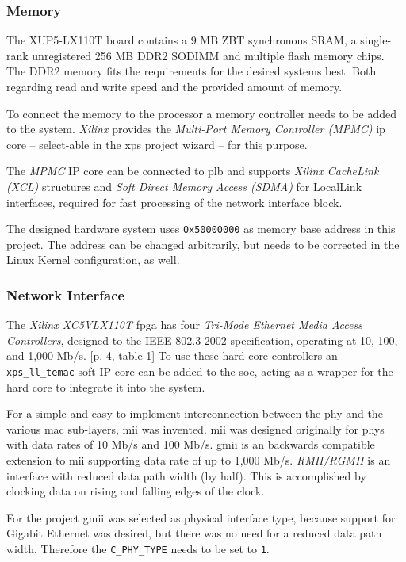\subsubsection{Memory}

The XUP5-LX110T board contains a 9 MB ZBT synchronous SRAM, a single-rank unregistered 256 MB DDR2 SODIMM and multiple flash memory chips. The DDR2 memory fits the requirements for the desired systems best. Both regarding read and write speed and the provided amount of memory.

To connect the memory to the processor a memory controller needs to be added to the system.  \textit{Xilinx} provides the \textit{Multi-Port Memory Controller (MPMC)} \gls{ip} core -- select-able in the \gls{xps} project wizard -- for this purpose.

The \textit{MPMC} IP core can be connected to \gls{plb} and supports \textit{Xilinx CacheLink (XCL)} structures and \textit{Soft Direct Memory Access (SDMA)} for LocalLink interfaces, required for fast processing of the network interface block. \cite{mpmc}

The designed hardware system uses \texttt{0x50000000} as memory base address in this project. The address can be changed arbitrarily, but needs to be corrected in the Linux Kernel configuration, as well.

\subsubsection{Network Interface}

The \textit{Xilinx XC5VLX110T} \gls{fpga} has four \textit{Tri-Mode Ethernet Media Access Controllers}, designed to the IEEE 802.3-2002 specification, operating at 10, 100, and 1,000 Mb/s. \cite{virtex5}[p. 4, table 1] To use these hard core controllers an \texttt{xps\_ll\_temac} soft IP core can be added to the \gls{soc}, acting as a wrapper for the hard core to integrate it into the system.

For a simple and easy-to-implement interconnection between the \gls{phy} and the various \gls{mac} sub-layers, \gls{mii} was invented. \gls{mii} was designed originally for \gls{phy}s with data rates of 10 Mb/s and 100 Mb/s. \gls{gmii} is an backwards compatible extension to \gls{mii} supporting data rate of up to 1,000 Mb/s. \textit{RMII/RGMII} is an interface with reduced data path width (by half). This is accomplished by clocking data on rising and falling edges of the clock.

For the project \gls{gmii} was selected as physical interface type, because support for Gigabit Ethernet was desired, but there was no need for a reduced data path width. Therefore the \texttt{C\_PHY\_TYPE} needs to be set to \texttt{1}.

